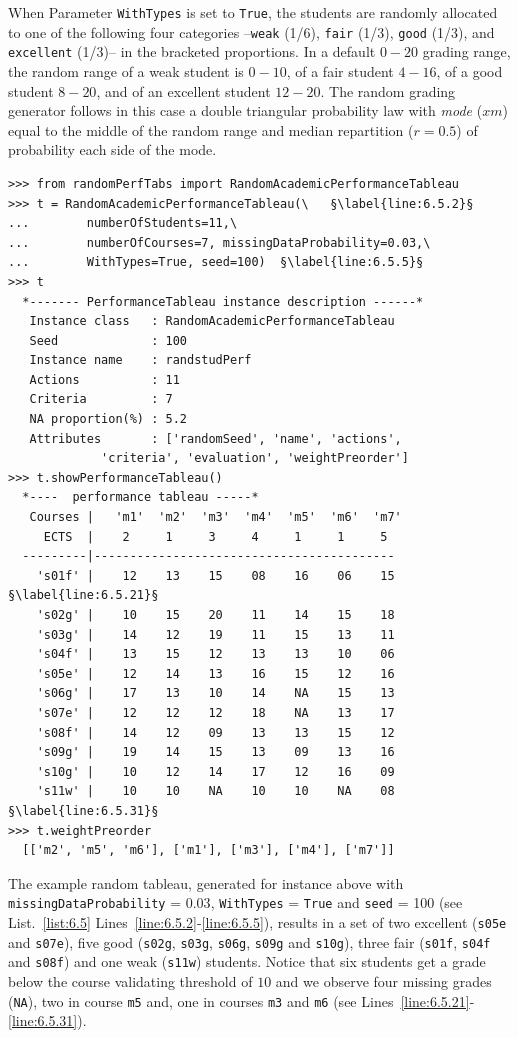 When Parameter \texttt{WithTypes} is set to \texttt{True}, the students are randomly allocated to one of the following four categories --\texttt{weak} (1/6), \texttt{fair} (1/3), \texttt{good} (1/3), and \texttt{excellent} (1/3)-- in the bracketed proportions. In a default $0-20$ grading range, the random range of a weak student is $0-10$, of a fair student $4-16$, of a good student $8-20$, and of an excellent student $12-20$. The random grading generator follows in this case a double triangular probability law with \emph{mode} ($xm$) equal to the middle of the random range and median repartition ($r = 0.5$) of probability each side of the mode.
\begin{lstlisting}[caption={Generating a random academic performance tableau},label=list:6.5]
>>> from randomPerfTabs import RandomAcademicPerformanceTableau
>>> t = RandomAcademicPerformanceTableau(\   §\label{line:6.5.2}§
...        numberOfStudents=11,\
...        numberOfCourses=7, missingDataProbability=0.03,\
...        WithTypes=True, seed=100)  §\label{line:6.5.5}§
>>> t
  *------- PerformanceTableau instance description ------*
   Instance class   : RandomAcademicPerformanceTableau
   Seed             : 100
   Instance name    : randstudPerf
   Actions          : 11
   Criteria         : 7
   NA proportion(%) : 5.2
   Attributes       : ['randomSeed', 'name', 'actions',
             'criteria', 'evaluation', 'weightPreorder']
>>> t.showPerformanceTableau()
  *----  performance tableau -----*
   Courses |   'm1'  'm2'  'm3'  'm4'  'm5'  'm6'  'm7' 
     ECTS  |    2     1     3     4     1     1     5    
  ---------|------------------------------------------
    's01f' |    12    13    15    08    16    06    15   §\label{line:6.5.21}§
    's02g' |    10    15    20    11    14    15    18   
    's03g' |    14    12    19    11    15    13    11   
    's04f' |    13    15    12    13    13    10    06   
    's05e' |    12    14    13    16    15    12    16   
    's06g' |    17    13    10    14    NA    15    13   
    's07e' |    12    12    12    18    NA    13    17   
    's08f' |    14    12    09    13    13    15    12   
    's09g' |    19    14    15    13    09    13    16   
    's10g' |    10    12    14    17    12    16    09   
    's11w' |    10    10    NA    10    10    NA    08   §\label{line:6.5.31}§
>>> t.weightPreorder
  [['m2', 'm5', 'm6'], ['m1'], ['m3'], ['m4'], ['m7']]
\end{lstlisting}
  
The example random tableau, generated for instance above with \texttt{missingData\-Proba\-bility} = $0.03$, \texttt{WithTypes} = \texttt{True} and \texttt{seed} = 100 (see List.~\vref{list:6.5} Lines~\ref{line:6.5.2}-\ref{line:6.5.5}), results in a set of two excellent (\texttt{s05e} and \texttt{s07e}), five good (\texttt{s02g}, \texttt{s03g}, \texttt{s06g}, \texttt{s09g} and \texttt{s10g}), three fair (\texttt{s01f}, \texttt{s04f} and \texttt{s08f}) and one weak (\texttt{s11w}) students. Notice that six students get a grade below the course validating threshold of $10$ and we observe four missing grades (\texttt{NA}), two in course \texttt{m5} and, one in courses \texttt{m3} and \texttt{m6} (see Lines~\ref{line:6.5.21}-\ref{line:6.5.31}).

